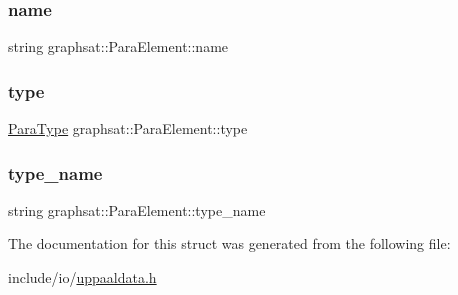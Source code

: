 \subsubsection{\texorpdfstring{name}{name}}
{\footnotesize\ttfamily string graphsat\+::\+Para\+Element\+::name}

\mbox{\label{structgraphsat_1_1_para_element_a85ae0f63397c6e54fab1f2e735a942ad}} 
\subsubsection{\texorpdfstring{type}{type}}
{\footnotesize\ttfamily \mbox{\hyperlink{namespacegraphsat_abadbdfbf31432f83971eda936d4022f4}{Para\+Type}} graphsat\+::\+Para\+Element\+::type}

\mbox{\label{structgraphsat_1_1_para_element_a577f8c019af46a3d7f923cb5c4a5a26d}} 
\subsubsection{\texorpdfstring{type\_name}{type\_name}}
{\footnotesize\ttfamily string graphsat\+::\+Para\+Element\+::type\+\_\+name}



The documentation for this struct was generated from the following file\+:\begin{DoxyCompactItemize}
\item 
include/io/\mbox{\hyperlink{uppaaldata_8h}{uppaaldata.\+h}}\end{DoxyCompactItemize}
